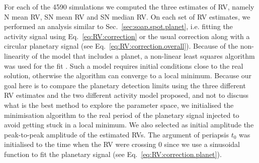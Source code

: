\documentclass{aa}
\begin{document}
For each of the 4590 simulations we computed the three estimates of RV, namely N mean RV, SN mean RV and SN median RV. 
On each set of RV estimates, we performed an analysis similar to Sec.~\ref{sec:soap.spot.planet}, i.e. fitting the activity signal using Eq.~\eqref{eq:RV:correction}
or the usual correction along with a circular planetary signal (see Eq.~\eqref{eq:RV:correction.overall}). Because of the non-linearity of the model that includes a 
planet, a non-linear least squares algorithm was used for the fit \citep[][]{levenberg1944method,marquardt1963algorithm,teunissen1990nonlinear}. Such a model requires
initial conditions close to the real solution, otherwise the algorithm can converge to a local minimum. Because our goal here is to compare the planetary detection limits
using the three different RV estimates and the two different activity model proposed, and not to discuss what is the best method to explore the parameter space, we 
initialised the minimisation algorithm to the real period of the planetary signal injected to avoid getting stuck in a local minimum. We also selected as initial amplitude the peak-to-peak amplitude of the estimated RVs.
The argument of periapsis $t_0$ was initialised to the time when the RV were crossing 0 since we use a sinusoidal function to fit the planetary signal (see Eq.~\eqref{eq:RV:correction.planet}).
\end{document}
